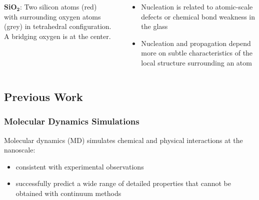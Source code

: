 {\begin{columns}
\begin{column}{.5\textwidth}
\begin{figure}[!b]
    \label{fig:tetrahedra}
\end{figure}

    {\bf SiO$_\mathbf{2}$}: Two silicon atoms (red)\\with surrounding oxygen atoms (grey) in tetrahedral configuration. A bridging oxygen is at the center.
    
		\end{column}
   		\begin{column}{.6\textwidth}
        \begin{block}{}
		\begin{itemize} 
        \item Nucleation is related to atomic-scale defects or chemical bond weakness in the glass
        \item Nucleation and propagation depend more on subtle characteristics of the local structure surrounding an atom\\
    \end{itemize}
    \end{block}
		\end{column}
	\end{columns}
}


\subsection{Previous Work}
\frame
{\frametitle{Molecular Dynamics Simulations}
\begin{block}{}
Molecular dynamics (MD) simulates chemical and physical interactions at the nanoscale:
\begin{itemize}
    \item consistent with experimental observations
    \item successfully predict a wide range of detailed properties that cannot be obtained with continuum methods
\end{itemize}
\end{block}
}


